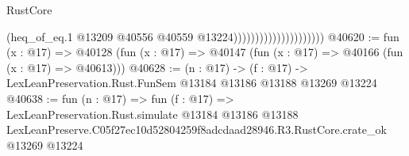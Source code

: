 \begin{lexlean}{RustCore}
\begin{coremodule}
                                            (heq_of_eq.{1}
                                              @13209
                                              @40556
                                              @40559
                                              @13224)))))))))))))))))))))
@40620 := fun (x : @17) =>
  @40128 (fun (x : @17) => @40147 (fun (x : @17) => @40166 (fun (x : @17) => @40613)))
@40628 := (n : @17) ->
  (f : @17) -> LexLeanPreservation.Rust.FunSem @13184 @13186 @13188 @13269 @13224
@40638 := fun (n : @17) =>
  fun (f : @17) =>
  LexLeanPreservation.Rust.simulate
    @13184
    @13186
    @13188
    LexLeanPreserve.C05f27ec10d52804259f8adcdaad28946.R3.RustCore.crate_ok
    @13269
    @13224
\end{coremodule}
\end{lexlean}
